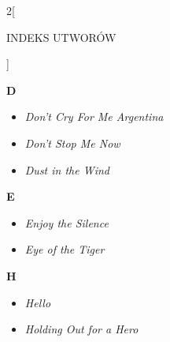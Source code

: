 \documentclass[a4paper]{report}
\begin{document}
\begin{multicols*}{2}[\begin{Huge}INDEKS UTWORÓW\end{Huge}\vspace{1cm}]
\begin{minipage}{\columnwidth}
\begin{itemize}[topsep=6pt, after=\vspace{5mm}, leftmargin=0mm]
	\end{itemize}
\end{minipage}
\begin{minipage}{\columnwidth}
\begin{Large}
		\textbf{D}
	\end{Large} 
	\begin{itemize}[topsep=6pt, after=\vspace{5mm}, leftmargin=0mm]
		\itemsep0em
		\item[]\textit{Don't Cry For Me Argentina}  \\
		\item[]  \textit{Don't Stop Me Now}  \\
		\item[]  \textit{Dust in the Wind}  \\
	\end{itemize}
\end{minipage}
\begin{minipage}{\columnwidth}
\begin{Large}
		\textbf{E}
	\end{Large} 
	\begin{itemize}[topsep=6pt, after=\vspace{5mm}, leftmargin=0mm]
		\itemsep0em
		\item[]\textit{Enjoy the Silence}  \\
		\item[]  \textit{Eye of the Tiger}  \\
	\end{itemize}
\end{minipage}
\begin{minipage}{\columnwidth}
\begin{Large}
		\textbf{H}
	\end{Large} 
	\begin{itemize}[topsep=6pt, after=\vspace{1.5mm}, leftmargin=0mm]
		\itemsep0em
		\item[]\textit{Hello}  \\
		\item[]  \textit{Holding Out for a Hero}  \\
	\end{itemize}
\end{minipage}
\begin{minipage}{\columnwidth}
	\begin{itemize}[topsep=6pt, after=\vspace{5mm}, leftmargin=0mm]

\end{itemize}
\end{minipage}
\end{multicols*}
\end{document}

